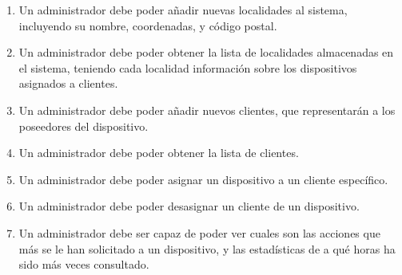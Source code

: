 \begin{enumerate}
    \item Un administrador debe poder añadir nuevas localidades al sistema, incluyendo su nombre, coordenadas, y código postal.
    
    \item Un administrador debe poder obtener la lista de localidades almacenadas en el sistema, teniendo cada localidad información sobre los dispositivos asignados a clientes.
    
    \item Un administrador debe poder añadir nuevos clientes, que representarán a los poseedores del dispositivo. 
    
    \item Un administrador debe poder obtener la lista de clientes.
    
    \item Un administrador debe poder asignar un dispositivo a un cliente específico.
    
    \item Un administrador debe poder desasignar un cliente de un dispositivo.
    
    \item Un administrador debe ser capaz de poder ver cuales son las acciones que más se le han solicitado a un dispositivo, y las estadísticas de a qué horas ha sido más veces consultado.

\end{enumerate}


